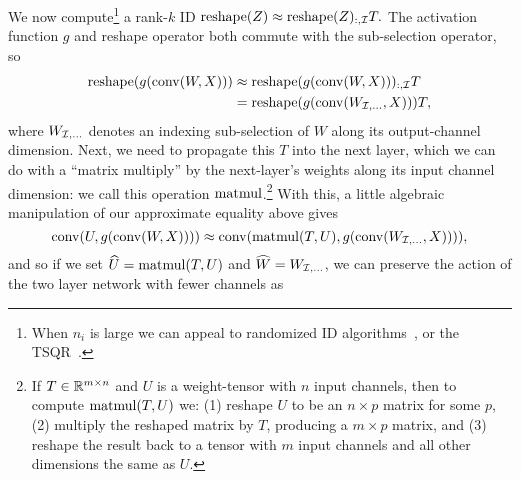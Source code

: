 We now compute\footnote{When $n_i$ is large we can appeal to randomized ID algorithms~\cite{martinsson2011randomized}, or the TSQR~\cite{ballard2014tsqr}.
} a rank-$k$ ID
$\operatorname{reshape}(Z) \approx \operatorname{reshape}(Z)_{:,\mathcal{I}} T.$
The activation function $g$ and reshape operator both commute with the sub-selection operator, so
\begin{align*}
    \operatorname{reshape}(g(\operatorname{conv}(W, X)))
    &\approx
    \operatorname{reshape}(g(\operatorname{conv}(W, X)))_{:,\mathcal{I}} T \\
    &=
    \operatorname{reshape}(g(\operatorname{conv}(W_{\mathcal{I},\ldots}, X))) T,
\end{align*}
where $W_{\mathcal{I},\ldots}$ denotes an indexing sub-selection of $W$ along its output-channel dimension. 
Next, we need to propagate this $T$ into the next layer, which we can do with a ``matrix multiply'' by the next-layer's weights along its input channel dimension: we call this operation $\operatorname{matmul}$.\footnote{If $T \in \mathbb{R}^{m \times n}$ and $U$ is a weight-tensor with $n$ input channels, then to compute $\operatorname{matmul}(T,U)$ we: (1) reshape $U$ to be an $n \times p$ matrix for some $p$, (2) multiply the reshaped matrix by $T$, producing a $m \times p$ matrix, and (3) reshape the result back to a tensor with $m$ input channels and all other dimensions the same as $U$.}
With this, a little algebraic manipulation of our approximate equality above gives
\begin{equation}
    \operatorname{conv}(U, g( \operatorname{conv}(W, X)))) \\
    \approx 
    \operatorname{conv}(\operatorname{matmul}(T,U), g( \operatorname{conv}(W_{\mathcal{I},\ldots}, X)))),
\end{equation}
and so if we set $\widehat U = \operatorname{matmul}(T,U)$ and $\widehat W = W_{\mathcal{I},\ldots}$,
we can preserve the action of the two layer network with fewer channels as
